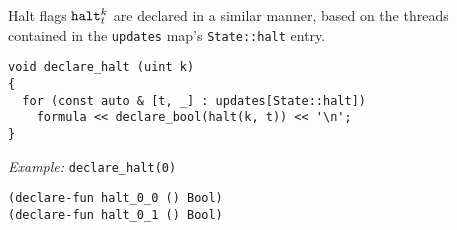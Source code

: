 

\noindent
Halt flags $\texttt{halt}^k_t$ are declared in a similar manner, based on the threads contained in the \texttt{updates} map's \texttt{State::halt} entry.

\newpage
\begin{lstlisting}[style=c++]
void declare_halt (uint k)
{
  for (const auto & [t, _] : updates[State::halt])
    formula << declare_bool(halt(k, t)) << '\n';
}
\end{lstlisting}

\noindent
\emph{Example:} \lstinline[style=c++]{declare_halt(0)}

\begin{lstlisting}[language=SMTLib]
(declare-fun halt_0_0 () Bool)
(declare-fun halt_0_1 () Bool)
\end{lstlisting}







